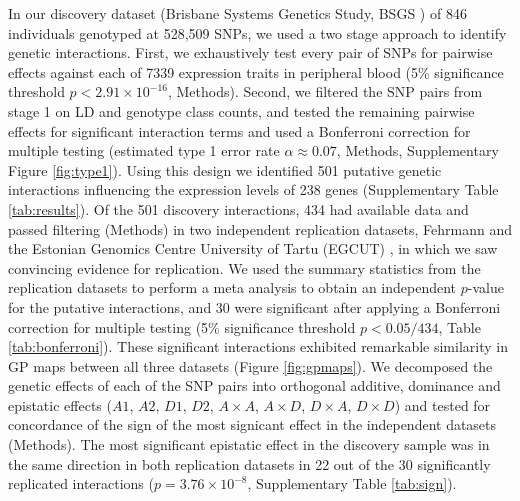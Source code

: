 \documentclass{article}
\begin{document}
In our discovery dataset (Brisbane Systems Genetics Study, BSGS \cite{Powell2012}) of 846 individuals genotyped at 528,509 SNPs, we used a two stage approach to identify genetic interactions. First, we exhaustively test every pair of SNPs for pairwise effects against each of 7339 expression traits in peripheral blood (5\% significance threshold $ p < 2.91 \times 10^{-16}$, Methods). Second, we filtered the SNP pairs from stage 1 on LD and genotype class counts, and tested the remaining pairwise effects for significant interaction terms and used a Bonferroni correction for multiple testing (estimated type 1 error rate $\alpha \approx 0.07$, Methods, Supplementary Figure \ref{fig:type1}). Using this design we identified 501 putative genetic interactions influencing the expression levels of 238 genes (Supplementary Table \ref{tab:results}). Of the 501 discovery interactions, 434 had available data and passed filtering (Methods) in two independent replication datasets, Fehrmann \cite{Fehrmann2011} and the Estonian Genomics Centre University of Tartu (EGCUT) \cite{Metspalu2004}, in which we saw convincing evidence for replication. We used the summary statistics from the replication datasets to perform a meta analysis to obtain an independent $p$-value for the putative interactions, and 30 were significant after applying a Bonferroni correction for multiple testing (5\% significance threshold $p < 0.05/434$, Table \ref{tab:bonferroni}). These significant interactions exhibited remarkable similarity in GP maps between all three datasets (Figure \ref{fig:gpmaps}). We decomposed the genetic effects of each of the SNP pairs into orthogonal additive, dominance and epistatic effects ($A1$, $A2$, $D1$, $D2$, $A \times A$, $A \times D$, $D \times A$, $D \times D$) and tested for concordance of the sign of the most signicant effect in the independent datasets (Methods). The most significant epistatic effect in the discovery sample was in the same direction in both replication datasets in 22 out of the 30 significantly replicated interactions ($p = 3.76 \times 10^{-8}$, Supplementary Table \ref{tab:sign}).
\end{document}
